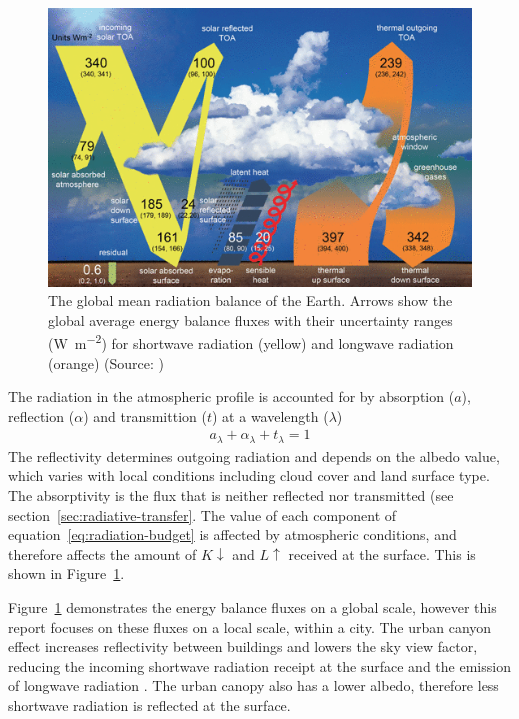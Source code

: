 \documentclass[a4paper,titlepage, twoside]{report}
\newcommand\Kdown{K\!\!\downarrow}
\newcommand\Lup{L\!\!\uparrow}
\begin{document}
\begin{figure}
\centering
\includegraphics[width=\textwidth]{radiation.png}
\caption{The global mean radiation balance of the Earth. Arrows show the global average energy balance fluxes with their uncertainty ranges (\si{\watt\per\meter\squared}) for shortwave radiation (yellow) and longwave radiation (orange) (Source: \cite{wild})}
\label{fig:energy-budget}
\end{figure}

The radiation in the atmospheric profile is accounted for by absorption ($a$), reflection ($\alpha$) and transmittion ($t$) at a wavelength ($\lambda$) \parencite{fest}
\begin{align}
a_\lambda + \alpha_\lambda + t_\lambda = 1 \label{eq:radiation-budget}
\end{align}
The reflectivity determines outgoing radiation and depends on the albedo value, which varies with local conditions including cloud cover and land surface type. The absorptivity is the flux that is neither reflected nor transmitted (see section~\ref{sec:radiative-transfer}.  The value of each component of equation~\ref{eq:radiation-budget} is affected by atmospheric conditions, and therefore affects the amount of $\Kdown$ and $\Lup$ received at the surface. This is shown in Figure~\ref{fig:energy-budget}.

Figure~\ref{fig:energy-budget} demonstrates the energy balance fluxes on a global scale, however this report focuses on these fluxes on a local scale, within a city. The urban canyon effect increases reflectivity between buildings and lowers the sky view factor, reducing the incoming shortwave radiation receipt at the surface and the emission of longwave radiation \parencite{cleugh}.  The urban canopy also has a lower albedo, therefore less shortwave radiation is reflected at the surface.
\end{document}
